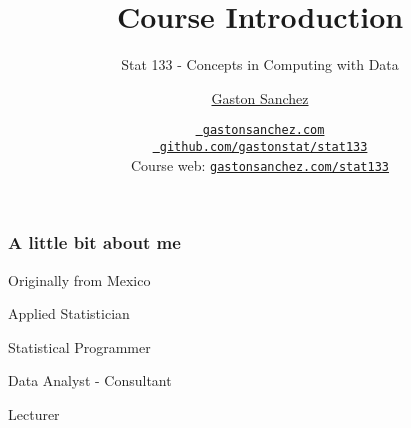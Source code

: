\documentclass[12pt]{beamer}\usepackage[]{graphicx}\usepackage[]{color}
\title{Course Introduction}
\subtitle{Stat 133 - Concepts in Computing with Data}
\author{\href{http://www.gastonsanchez.com}{Gaston Sanchez}}
\institute{Department of Statistics, UC{\textendash}Berkeley}
\date{\href{http://www.gastonsanchez.com}{\tt \scriptsize \color{foreground} gastonsanchez.com}
\\[-4pt]
\href{http://github.com/gastonstat/133}{\tt \scriptsize \color{foreground} github.com/gastonstat/stat133}
\\[-4pt]
{\scriptsize Course web: \href{http://www.gastonsanchez.com/stat133}{\tt gastonsanchez.com/stat133}}
}
\begin{document}
{
  \frame{
    \titlepage
  } 
}


\begin{frame}
\begin{center}
\Huge{}
\end{center}
\end{frame}


\begin{frame}[fragile]
\frametitle{}
\begin{center}
\end{center}
\end{frame}


\begin{frame}
\frametitle{A little bit about me}

\bbi
 \item Originally from Mexico
 \item Applied Statistician
 \item Statistical Programmer
 \item Data Analyst - Consultant
 \item Lecturer
\ei

\end{frame}


\begin{frame}
\begin{center}
\end{center}
\end{frame}


\begin{frame}
\begin{center}
\end{center}
\end{frame}


\begin{frame}
\begin{center}
{\Large {}}
\pause

\bigskip
{\Large {}}
\end{center}
\end{frame}
\end{document}
